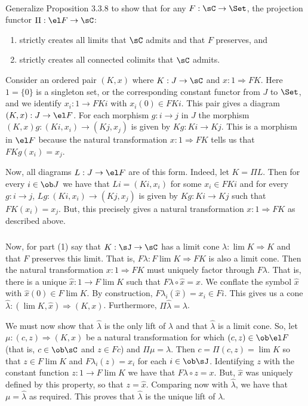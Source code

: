 \documentclass[../../main]{subfiles}
\begin{document}
\paragraph{}
\begin{exercise}
	Generalize Proposition 3.3.8 to show that for any $F:\sC\rightarrow\Set$, the projection functor $\Pi:\el F\rightarrow\sC$:
	\begin{enumerate}
		\item strictly creates all limits that $\sC$ admits and that $F$ preserves, and
		\item strictly creates all connected colimits that $\sC$ admits.
	\end{enumerate}
\end{exercise}

Consider an ordered pair $(K,x)$ where $K:J\rightarrow\sC$ and $x:1\Rightarrow
FK$. Here $1=\{0\}$ is a singleton set, or the corresponding constant functor
from $J$ to $\Set$, and we identify $x_i:1\rightarrow FKi$ with $x_i(0)\in FKi$.
This pair gives a diagram $(K,x):J\rightarrow\el F$. For each morphism
$g:i\rightarrow j$ in $J$ the morphism $(K,x)g:(Ki,x_i)\rightarrow(Kj,x_j)$ is
given by $Kg:Ki\rightarrow Kj$. This is a morphism in $\el F$ because the
natural transformation $x:1\Rightarrow FK$ tells us that $FKg(x_i)=x_j$.

Now, all diagrams $L:J\rightarrow\el F$ are of this form. Indeed, let $K=\Pi L$.
Then for every $i\in\ob J$ we have that $Li=(Ki,x_i)$ for some $x_i\in FKi$ and
for every $g:i\rightarrow j$, $Lg:(Ki,x_i)\rightarrow(Kj,x_j)$ is given by
$Kg:Ki\rightarrow Kj$ such that $FK(x_i)=x_j$. But, this precisely gives a
natural transformation $x:1\Rightarrow FK$ as described above.

\subparagraph{}
Now, for part (1) say that $K:\sJ\rightarrow\sC$ has a limit cone $\lambda:\lim
K\Rightarrow K$ and that $F$ preserves this limit. That is, $F\lambda:F\lim
K\Rightarrow FK$ is also a limit cone. Then the natural transformation
$x:1\Rightarrow FK$ must uniquely factor through $F\lambda$. That is, there is a
unique $\hat{x}:1\rightarrow F\lim K$ such that $F\lambda\circ\hat{x}=x$. We
conflate the symbol $\hat{x}$ with $\hat{x}(0)\in F\lim K$. By construction,
$F\lambda_i(\hat{x})=x_i\in Fi$. This gives us a cone $\hat{\lambda}:(\lim
K,\hat{x})\Rightarrow(K,x)$. Furthermore, $\Pi\hat{\lambda}=\lambda$.

We must now show that $\hat{\lambda}$ is the only lift of $\lambda$ and that
$\hat{\lambda}$ is a limit cone. So, let $\mu:(c,z)\Rightarrow(K,x)$ be a
natural transformation for which $(c,z)\in\ob\el F$ (that is, $c\in\ob\sC$ and
$z\in Fc$) and $\Pi\mu=\lambda$. Then $c=\Pi(c,z)=\lim K$ so that $z\in F\lim K$
and $F\lambda_i(z)=x_i$ for each $i\in\ob\sJ$. Identifying $z$ with the constant
function $z:1\rightarrow F\lim K$ we have that $F\lambda\circ z=x$. But,
$\hat{x}$ was uniquely defined by this property, so that $z=\hat{x}$. Comparing
now with $\hat{\lambda}$, we have that $\mu=\hat{\lambda}$ as required. This
proves that $\hat{\lambda}$ is the unique lift of $\lambda$.
\end{document}
